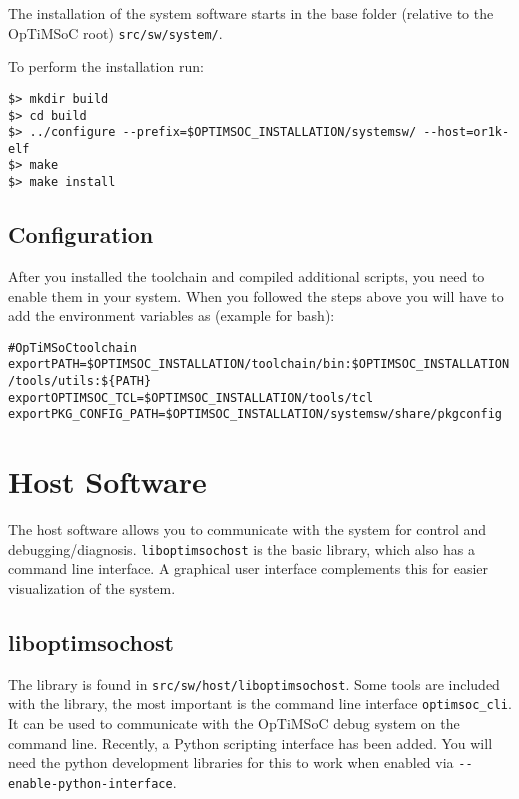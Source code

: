 The installation of the system software starts in the base folder
(relative to the OpTiMSoC root) \verb|src/sw/system/|.




To perform the installation run:

\begin{verbatim}
$> mkdir build
$> cd build
$> ../configure --prefix=$OPTIMSOC_INSTALLATION/systemsw/ --host=or1k-elf
$> make
$> make install
\end{verbatim}

\subsection{Configuration}

After you installed the toolchain and compiled additional scripts, you
need to enable them in your system. When you followed the steps above
you will have to add the environment variables as (example for bash):

\begin{alltt}
# OpTiMSoC toolchain
export PATH=\$OPTIMSOC_INSTALLATION/toolchain/bin:\$OPTIMSOC_INSTALLATION/tools/utils:\$\{PATH\}
export OPTIMSOC_TCL=\$OPTIMSOC_INSTALLATION/tools/tcl
export PKG_CONFIG_PATH=\$OPTIMSOC_INSTALLATION/systemsw/share/pkgconfig
\end{alltt}

\section{Host Software}

The host software allows you to communicate with the system for
control and debugging/diagnosis. \verb|liboptimsochost| is the basic
library, which also has a command line interface. A graphical user
interface complements this for easier visualization of the system.

\subsection{liboptimsochost}

The library is found in \verb|src/sw/host/liboptimsochost|.  Some
tools are included with the library, the most important is the command
line interface \verb|optimsoc_cli|. It can be used to communicate with
the OpTiMSoC debug system on the command line. Recently, a Python
scripting interface has been added. You will need the python
development libraries for this to work when enabled via
\verb|--enable-python-interface|.

